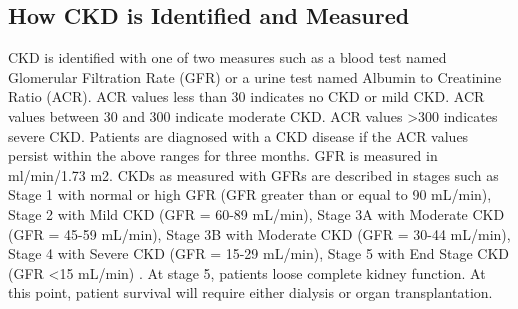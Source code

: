\subsection{How CKD is Identified and Measured}
CKD is identified with one of two measures such as a blood test named Glomerular Filtration Rate (GFR) or a urine test named Albumin to Creatinine Ratio (ACR).  ACR values less than 30 indicates no CKD or mild CKD. ACR values between 30 and 300 indicate moderate CKD. ACR values \textgreater 300 indicates severe CKD. Patients are diagnosed with a CKD disease if the ACR values persist within the above ranges for three months. GFR is measured in ml/min/1.73 m2. CKDs as measured with GFRs are described in stages such as Stage 1 with normal or high GFR (GFR greater than or equal to  90 mL/min), Stage 2 with Mild CKD (GFR = 60-89 mL/min), Stage 3A with Moderate CKD (GFR = 45-59 mL/min), Stage 3B with Moderate CKD (GFR = 30-44 mL/min), Stage 4 with Severe CKD (GFR = 15-29 mL/min), Stage 5 with End Stage CKD (GFR \textless 15 mL/min) \cite{Huangetal2013}. At stage 5, patients loose complete kidney function. At this point, patient survival will require either dialysis or organ transplantation.
